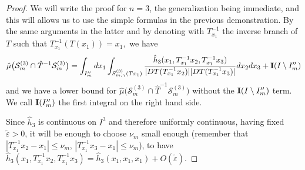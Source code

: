 \documentclass[12pt,reqno,a4paper]{amsart}
\let\tilde\widetilde
\def\eps{\varepsilon}
\def\eps {\varepsilon}
\begin{document}
\begin{proof}
We will write the proof for $n=3$, the generalization being immediate, and this will allows us to use the simple formulas in the previous demonstration. By the same arguments in the latter and by denoting with $T_{x_1}^{-1}$ the inverse branch of $T$ such that $T_{x_1}^{-1}(T(x_1))=x_1,$ we have
\begin{equation}\label{STOC}
\hat{\mu}\big(\mathcal{S}^{(3)}_{m}\cap\hat{T}^{-1}\mathcal{S}^{(3)}_{m}\big)=\int_{I''_m} dx_1\int_{S^{(3)}_{m,\gamma}(Tx_1)}\frac{\hat{h}_3(x_1, T_{x_1}^{-1}x_2, T_{x_1}^{-1}x_3)}{|DT(T_{x_1}^{-1}x_2)||DT(T_{x_1}^{-1}x_3)|}dx_2dx_3+{\bf I}(I\setminus I''_m)
\end{equation}
and we have a lower bound for $\hat{\mu}\big(\mathcal{S}^{(3)}_{m}\cap\hat{T}^{-1}\mathcal{S}^{(3)}_{m}\big)$ without the ${\bf I}(I\setminus I''_m)$ term. We call ${\bf I}(I''_m)$ the first integral on the right hand side.

Since $\hat{h}_3$ is continuous on $I^3$  and therefore uniformly continuous, having fixed $\tilde{\eps}>0$, it will be enough to choose $\nu_m$ small enough (remember  that
$|T_{x_1}^{-1}x_2-x_1|\le \nu_m$, $|T_{x_1}^{-1}x_3-x_1|\le \nu_m$),   to have
$
\hat{h}_3(x_1, T_{x_1}^{-1}x_2, T_{x_1}^{-1}x_3)=\hat{h}_3(x_1,x_1,x_1)+O(\tilde{\eps}).
$


\end{proof}
\end{document}
